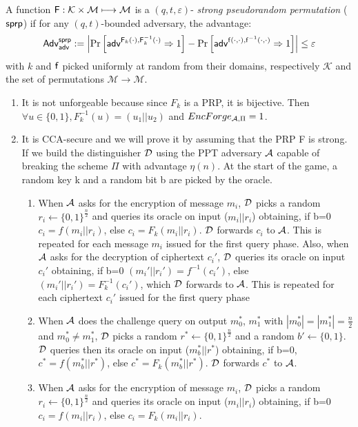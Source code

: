 A function $\operatorname{\mathsf{F}}:\mathcal{K} \times \mathcal{M} \longmapsto \mathcal{M}$ is a $(q,t,\varepsilon)$-\emph{ strong pseudorandom permutation} ($\operatorname{\mathsf{sprp}}$) if for any $(q,t)$-bounded adversary, the advantage:
$$ \mathsf{Adv}^{\operatorname{\mathsf{sprp}}}_{\operatorname{\mathsf{adv}}}:=
\left| \Pr\left[ \operatorname{\mathsf{adv}}^{\operatorname{\mathsf{F}}_k(\cdot),\operatorname{\mathsf{F}}_k^{-1}(\cdot)}\Rightarrow 1 \right] -
	\Pr\left[ \operatorname{\mathsf{adv}}^{\operatorname{\mathsf{f}}(\cdot,\cdot),\operatorname{\mathsf{f}}^{-1}(\cdot,\cdot)}\Rightarrow 1 \right] \right| 
\leq \varepsilon $$
with $k$  and $\operatorname{\mathsf{f}}$ picked uniformly at random from their domains, respectively $\mathcal{K}$ and the set of permutations $\mathcal{M} \rightarrow \mathcal{M}$.
\begin{solution}
\begin{enumerate}
    \item It is not unforgeable because since $F_k$ is a PRP, it is bijective. 
    \newline Then $\forall u \in \{0, 1\}, F_k^{-1}(u) = (u_1 || u_2)$ and $EncForge_{\mathcal{A}, \Pi} = 1$.
    \item It is CCA-secure and we will prove it by assuming that the PRP F is strong. 
    If we build the distinguisher $\mathcal{D}$ using the PPT adversary $\mathcal{A}$ capable of breaking the scheme $\Pi$ with advantage $\eta(n)$. At the start of the game, a random key k and a random bit b are picked by the oracle.
    \begin{enumerate}
        \item When $\mathcal{A}$ asks for the encryption of message $m_i$, $\mathcal{D}$ picks a random $r_i \leftarrow \{0, 1\}^{\frac{n}{2}}$ and queries its oracle on input ($m_i || r_i$) obtaining, if b=0 $c_i = f(m_i || r_i)$, else $c_i = F_k(m_i || r_i)$. 
        $\mathcal{D}$ forwards $c_i$ to $\mathcal{A}$. This is repeated for each message $m_i$ issued for the first query phase.
        \newline Also, when $\mathcal{A}$ asks for the decryption of ciphertext $c_i'$, $\mathcal{D}$ queries its oracle on input $c_i'$ obtaining, if b=0 $(m_i'||r_i') = f^{-1}(c_i')$, else $(m_i'||r_i') = F^{-1}_k(c_i')$, which $\mathcal{D}$ forwards to $\mathcal{A}$. This is repeated for each ciphertext $c_i'$ issued for the first query phase
        \item When $\mathcal{A}$ does the challenge query on output $m^*_0$, $m^*_1$ with $|m^*_0| = |m^*_1|=\frac{n}{2}$ and $m^*_0 \neq m^*_1$,  $\mathcal{D}$ picks a random $r^* \leftarrow \{0, 1\}^{\frac{n}{2}}$ and a random $b'\leftarrow \{0, 1\}$. $\mathcal{D}$ queries then its oracle on input ($m^*_b || r^*$) obtaining, if b=0, $c^* = f(m^*_b || r^*)$, else $c^* = F_k(m^*_b || r^*)$.  $\mathcal{D}$ forwards $c^*$ to $\mathcal{A}$.
        \item When $\mathcal{A}$ asks for the encryption of message $m_i$, $\mathcal{D}$ picks a random $r_i \leftarrow \{0, 1\}^{\frac{n}{2}}$ and queries its oracle on input ($m_i || r_i$) obtaining, if b=0 $c_i = f(m_i || r_i)$, else $c_i = F_k(m_i || r_i)$. 

\end{enumerate}
\end{enumerate}
\end{solution}

